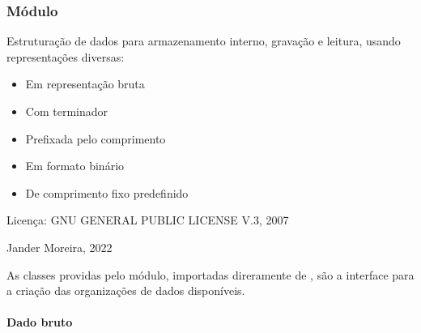 \documentclass[letterpaper,10pt,brazil]{sphinxmanual}
\begin{document}
\subsubsection{Módulo }
\label{\detokenize{estrutarq.dado:module-estrutarq.dado.dado_comum}}\label{\detokenize{estrutarq.dado:modulo-estrutarq-dado-comum}}
\sphinxAtStartPar
Estruturação de dados para armazenamento interno, gravação e leitura, usando
representações diversas:
\begin{itemize}
\item {} 
\sphinxAtStartPar
Em representação bruta

\item {} 
\sphinxAtStartPar
Com terminador

\item {} 
\sphinxAtStartPar
Prefixada pelo comprimento

\item {} 
\sphinxAtStartPar
Em formato binário

\item {} 
\sphinxAtStartPar
De comprimento fixo predefinido

\end{itemize}

\sphinxAtStartPar
Licença: GNU GENERAL PUBLIC LICENSE V.3, 2007

\sphinxAtStartPar
Jander Moreira, 2022

\sphinxAtStartPar
As classes providas pelo módulo, importadas direramente de , são a interface para a criação das organizações de dados disponíveis.


\paragraph{Dado bruto}
\label{\detokenize{estrutarq.dado:dado-bruto}}
\end{document}
